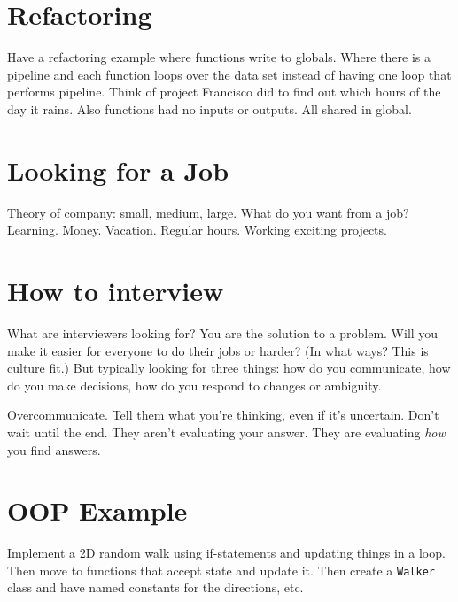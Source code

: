 \section{Refactoring} Have a refactoring example where functions write to
globals. Where there is a pipeline and each function loops over the data set
instead of having one loop that performs pipeline. Think of project Francisco
did to find out which hours of the day it rains. Also functions had no inputs or
outputs. All shared in global.

\section{Looking for a Job}
Theory of company: small, medium, large. What do you want from a job? Learning.
Money. Vacation. Regular hours. Working exciting projects.

\section{How to interview} What are interviewers looking for? You are the
solution to a problem. Will you make it easier for everyone to do their jobs or
harder? (In what ways? This is culture fit.) But typically looking for three
things: how do you communicate, how do you make decisions, how do you respond to
changes or ambiguity.

Overcommunicate. Tell them what you're thinking, even if it's uncertain. Don't
wait until the end. They aren't evaluating your answer. They are evaluating
\emph{how} you find answers.

\section{OOP Example} Implement a 2D random walk using if-statements and
updating things in a loop. Then move to functions that accept state and update
it. Then create a \texttt{Walker} class and have named constants for the
directions, etc.
